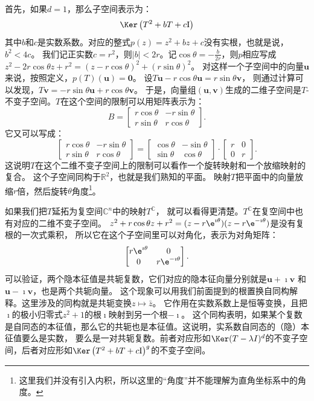 \documentclass[12pt,UTF8,fontset=none]{ctexbook}
\begin{document}
首先，如果$d = 1$，那么子空间表示为：
$$ \Ker \left(T^2 + bT + c\mathrm{I}\right) $$
其中$b$和$c$是实数系数。对应的整式$p(z) = z^2 + bz + c$没有实根，也就是说，$b^2 < 4c$。
我们记正实数$c = r^2$，则$|b| < 2r$。记$\cos\theta = -\frac{b}{2r}$，则$p$相应写成$z^2 - 2r\cos\theta z + r^2 = (z - r\cos\theta)^2 + (r\sin\theta)^2$。
对这样一个子空间中的向量$\mathbf{u}$来说，按照定义，$p(T)(\mathbf{u}) = \mathbf{0}$。
设$T\mathbf{u} - r\cos\theta \mathbf{u} = r\sin\theta \mathbf{v}$，
则通过计算可以发现，$T\mathbf{v} = -r\sin\theta \mathbf{u} + r\cos\theta \mathbf{v}$。
于是，向量组$(\mathbf{u}, \mathbf{v})$生成的二维子空间是$T$-不变子空间。$T$在这个空间的限制可以用矩阵表示为：
$$ B = \begin{bmatrix}
    r\cos\theta & -r\sin\theta \\ r\sin\theta & r\cos\theta
\end{bmatrix}.$$
它又可以写成：
$$ \begin{bmatrix}
    r\cos\theta & -r\sin\theta \\ r\sin\theta & r\cos\theta
\end{bmatrix} = \begin{bmatrix}
    \cos\theta & -\sin\theta \\ \sin\theta & \cos\theta
\end{bmatrix} \cdot \begin{bmatrix}
    r & 0 \\ 0 & r
\end{bmatrix}.$$
这说明$T$在这个二维不变子空间上的限制可以看作一个旋转映射和一个放缩映射的复合。
这个子空间同构于$\mathbb{R}^2$，也就是我们熟知的平面。
映射$T$把平面中的向量放缩$r$倍，然后旋转$\theta$角度\footnote{这里我们并没有引入内积，所以这里的“角度”并不能理解为直角坐标系中的角度。}。

如果我们把$T$延拓为复空间$\mathbb{C}^n$中的映射$T^\mathbb{C}$，
就可以看得更清楚。$T^\mathbb{C}$在复空间中也有对应的二维不变子空间。
$z^2 + r\cos\theta z + r^2 = (z - r\e^{\imath \theta})(z - r\e^{-\imath \theta})$是没有复根的一次式乘积，
所以它在这个子空间里可以对角化，表示为对角矩阵：
$$ \begin{bmatrix}
    r\e^{\imath \theta} & 0 \\ 0 & r\e^{-\imath \theta}
\end{bmatrix}.$$
可以验证，两个隐本征值是共轭复数，它们对应的隐本征向量分别就是$\mathbf{u}+\imath \mathbf{v}$
和$\mathbf{u}-\imath \mathbf{v}$，也是两个共轭向量。
这个现象可以用我们前面提到的根置换自同构解释。这里涉及的同构就是共轭变换$z \mapsto \bar{z}$。
它作用在实数系数上是恒等变换，且把$\imath $的极小归零式$z^2+1$的根$\imath $映射到另一个根$-\imath $。
这个同构表明，如果某个复数是自同态的本征值，那么它的共轭也是本征值。这说明，实系数自同态的（隐）本征值要么是实数，
要么是一对共轭复数。前者对应形如$\Ker (T - \lambda I)^{d}$的不变子空间，后者对应形如$\Ker \left(T^2 + b T + c\mathrm{I}\right)^{g}$的不变子空间。
\end{document}
